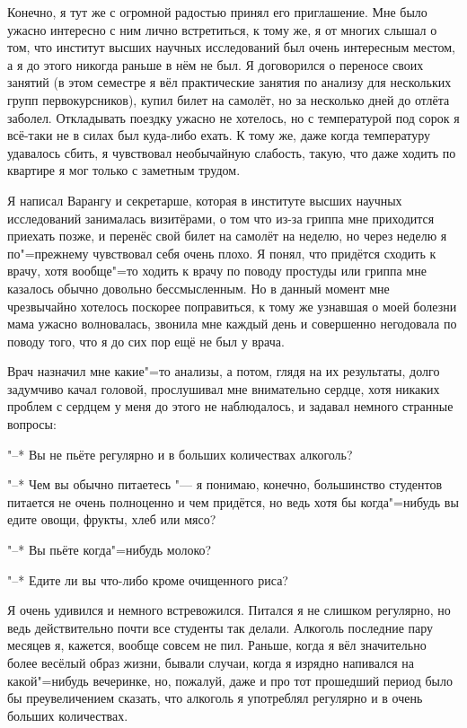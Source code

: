 Конечно, я тут же с огромной радостью принял его приглашение.
Мне было ужасно интересно с ним лично встретиться, к тому же, я от многих слышал
о том, что институт высших научных исследований был очень интересным местом, а
я до этого никогда раньше в нём не был.
Я договорился о переносе своих занятий (в этом семестре я вёл практические
занятия по анализу для нескольких групп первокурсников), купил билет на самолёт,
но за несколько дней до отлёта заболел.
Откладывать поездку ужасно не хотелось, но с температурой под сорок я всё-таки
не в силах был куда-либо ехать.
К тому же, даже когда температуру удавалось сбить, я чувствовал необычайную
слабость, такую, что даже ходить по квартире я мог только с заметным трудом.

Я написал Варангу и секретарше, которая в институте высших научных исследований
занималась визитёрами, о том что из-за гриппа мне приходится приехать позже, и
перенёс свой билет на самолёт на неделю, но через неделю я по"=прежнему
чувствовал себя очень плохо.
Я понял, что придётся сходить к врачу, хотя вообще"=то ходить к врачу по поводу
простуды или гриппа мне казалось обычно довольно бессмысленным.
Но в данный момент мне чрезвычайно хотелось поскорее поправиться, к тому же
узнавшая о моей болезни мама ужасно волновалась, звонила мне каждый день и
совершенно негодовала по поводу того, что я до сих пор ещё не был у врача.

Врач назначил мне какие"=то анализы, а потом, глядя на их результаты, долго
задумчиво качал головой, прослушивал мне внимательно сердце, хотя никаких
проблем с сердцем у меня до этого не наблюдалось, и задавал немного странные
вопросы:

"--* Вы не пьёте регулярно и в больших количествах алкоголь?

"--* Чем вы обычно питаетесь "--- я понимаю, конечно, большинство студентов питается
не очень полноценно и чем придётся, но ведь хотя бы когда"=нибудь вы едите овощи,
фрукты, хлеб или мясо?

"--* Вы пьёте когда"=нибудь молоко?

"--* Едите ли вы что-либо кроме очищенного риса?

Я очень удивился и немного встревожился.
Питался я не слишком регулярно, но ведь действительно почти все студенты так
делали.
Алкоголь последние пару месяцев я, кажется, вообще совсем не пил.
Раньше, когда я вёл значительно более весёлый образ жизни, бывали случаи, когда
я изрядно напивался на какой"=нибудь вечеринке, но, пожалуй, даже и про тот
прошедший период было бы преувеличением сказать, что алкоголь я употреблял
регулярно и в очень больших количествах.

